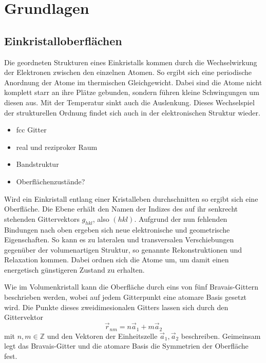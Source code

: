 \chapter{Grundlagen}
    \section{Einkristalloberflächen}
        Die geordneten Strukturen eines Einkristalls kommen durch die Wechselwirkung der Elektronen zwischen den einzelnen Atomen.
        So ergibt sich eine periodische Anordnung der Atome im thermischen Gleichgewicht.
        Dabei sind die Atome nicht komplett starr an ihre Plätze gebunden, sondern führen kleine Schwingungen um diesen aus.
        Mit der Temperatur sinkt auch die Auslenkung.
        Dieses Wechselspiel der strukturellen Ordnung findet sich auch in der elektronischen Struktur wieder.
        \begin{itemize}
            \item fcc Gitter
            \item real und reziproker Raum
            \item Bandstruktur
            \item Oberflächenzustände?
        \end{itemize}
        
        Wird ein Einkristall entlang einer Kristalleben durchschnitten so ergibt sich eine Oberfläche.
        Die Ebene erhält den Namen der Indizes des auf ihr senkrecht stehenden Gittervektors $g_{hkl}$, also $(hkl)$.
        Aufgrund der nun fehlenden Bindungen nach oben ergeben sich neue elektronische und geometrische Eigenschaften.
        So kann es zu lateralen und transversalen Verschiebungen gegenüber der volumenartigen Struktur, so genannte Rekonstruktionen und Relaxation kommen.
        Dabei ordnen sich die Atome um, um damit einen energetisch günstigeren Zustand zu erhalten.

        Wie im Volumenkristall kann die Oberfläche durch eins von fünf Bravais-Gittern beschrieben werden, wobei auf jedem Gitterpunkt eine atomare Basis gesetzt wird.
        Die Punkte dieses zweidimesionalen Gitters lassen sich durch den Gittervektor
        \begin{equation}
            \vec{r}_{nm} = n \vec{a}_1 + m \vec{a}_2
            \label{eqn:Gittervek}
        \end{equation}
        mit $n,m \in \mathbb{Z}$ und den Vektoren der Einheitszelle $\vec{a}_1, \vec{a}_2$ beschreiben.
        Geimeinsam legt das Bravais-Gitter und die atomare Basis die Symmetrien der Oberfläche fest.

